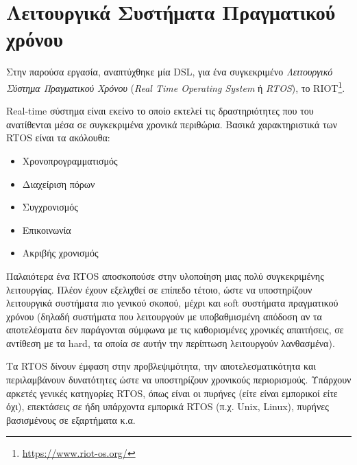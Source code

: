 \section{Λειτουργικά Συστήματα Πραγματικού χρόνου}
\label{sec:theory_rtos}

Στην παρούσα εργασία, αναπτύχθηκε μία DSL, για ένα συγκεκριμένο \textit{Λειτουργικό Σύστημα Πραγματικού Χρόνου} (\textit{Real Time Operating System} ή \textit{RTOS}), το RIOT\footnote{\url{https://www.riot-os.org/}}.

Real-time σύστημα είναι εκείνο το οποίο εκτελεί τις δραστηριότητες που του ανατίθενται μέσα σε συγκεκριμένα χρονικά περιθώρια. Βασικά χαρακτηριστικά των RTOS είναι τα ακόλουθα:

\begin{itemize}
	\item Χρονοπρογραμματισμός
	\item Διαχείριση πόρων
	\item Συγχρονισμός
	\item Επικοινωνία
	\item Ακριβής χρονισμός
\end{itemize}
	
Παλαιότερα ένα RTOS αποσκοπούσε στην υλοποίηση μιας πολύ συγκεκριμένης λειτουργίας. Πλέον έχουν εξελιχθεί σε επίπεδο τέτοιο, ώστε να υποστηρίζουν λειτουργικά συστήματα πιο γενικού σκοπού, μέχρι και soft συστήματα πραγματικού χρόνου (δηλαδή συστήματα που λειτουργούν με υποβαθμισμένη απόδοση αν τα αποτελέσματα δεν παράγονται σύμφωνα με τις καθορισμένες χρονικές απαιτήσεις, σε αντίθεση με τα hard, τα οποία σε αυτήν την περίπτωση λειτουργούν λανθασμένα).

Τα RTOS δίνουν έμφαση στην προβλεψιμότητα, την αποτελεσματικότητα και περιλαμβάνουν δυνατότητες ώστε να υποστηρίζουν χρονικούς περιορισμούς. Υπάρχουν αρκετές γενικές κατηγορίες RTOS, όπως είναι οι πυρήνες (είτε είναι εμπορικοί είτε όχι), επεκτάσεις σε ήδη υπάρχοντα εμπορικά RTOS (π.χ. Unix, Linux), πυρήνες βασισμένους σε εξαρτήματα κ.α. \cite{bib:stankovic_2004}